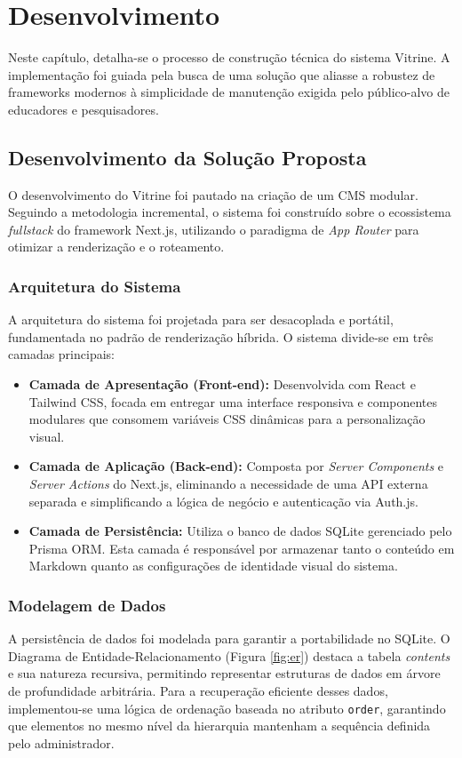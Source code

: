 \chapter{Desenvolvimento}\label{cap:devSistema}

Neste capítulo, detalha-se o processo de construção técnica do sistema Vitrine. A implementação foi guiada pela busca de uma solução que aliasse a robustez de frameworks modernos à simplicidade de manutenção exigida pelo público-alvo de educadores e pesquisadores.

\section{Desenvolvimento da Solução Proposta}
O desenvolvimento do Vitrine foi pautado na criação de um CMS modular. Seguindo a metodologia incremental, o sistema foi construído sobre o ecossistema \textit{fullstack} do framework Next.js, utilizando o paradigma de \textit{App Router} para otimizar a renderização e o roteamento.

\subsection{Arquitetura do Sistema}
A arquitetura do sistema foi projetada para ser desacoplada e portátil, fundamentada no padrão de renderização híbrida. O sistema divide-se em três camadas principais:

\begin{itemize}
    \item \textbf{Camada de Apresentação (Front-end):} Desenvolvida com React e Tailwind CSS, focada em entregar uma interface responsiva e componentes modulares que consomem variáveis CSS dinâmicas para a personalização visual.
    \item \textbf{Camada de Aplicação (Back-end):} Composta por \textit{Server Components} e \textit{Server Actions} do Next.js, eliminando a necessidade de uma API externa separada e simplificando a lógica de negócio e autenticação via Auth.js.
    \item \textbf{Camada de Persistência:} Utiliza o banco de dados SQLite gerenciado pelo Prisma ORM. Esta camada é responsável por armazenar tanto o conteúdo em Markdown quanto as configurações de identidade visual do sistema.
\end{itemize}

\subsection{Modelagem de Dados}
A persistência de dados foi modelada para garantir a portabilidade no SQLite. O Diagrama de Entidade-Relacionamento (Figura \ref{fig:er}) destaca a tabela \textit{contents} e sua natureza recursiva, permitindo representar estruturas de dados em árvore de profundidade arbitrária. Para a recuperação eficiente desses dados, implementou-se uma lógica de ordenação baseada no atributo \texttt{order}, garantindo que elementos no mesmo nível da hierarquia mantenham a sequência definida pelo administrador.

